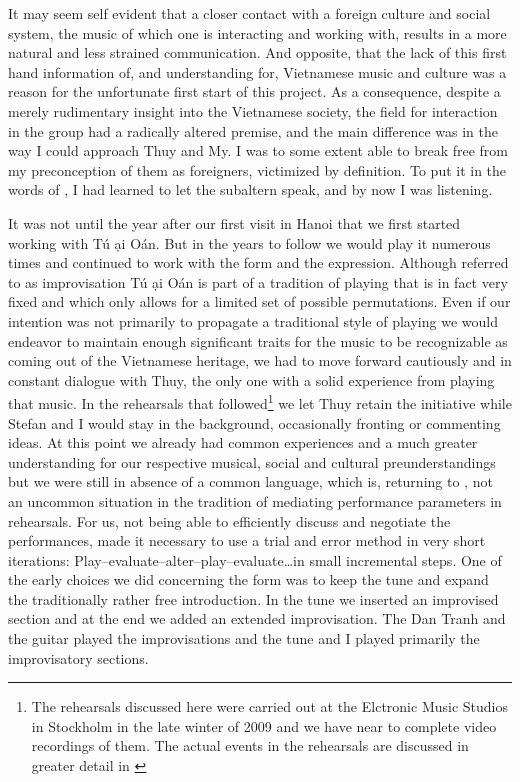 \documentclass[a4paper]{article}
\begin{document}
It may seem self evident that a closer contact with a foreign culture and social system, the music of which one is interacting and working with, results in a more natural and less strained communication. And opposite, that the lack of this first hand information of, and understanding for, Vietnamese music and culture was a reason for the unfortunate first start of this project. As a consequence, despite a merely rudimentary insight into the Vietnamese society, the field for interaction in the group had a radically altered premise, and the main difference was in the way I could approach Thuy and My. I was to some extent able to break free from my preconception of them as foreigners, victimized by definition. To put it in the words of \citep{spivak1988}, I had learned to let the subaltern speak, and by now I was listening. 

It was not until the year after our first visit in Hanoi that we first started working with T\'{u} \DH \d{a}i O\'{a}n. But in the years to follow we would play it numerous times and continued to work with the form and the expression. Although referred to as improvisation T\'{u} \DH \d{a}i O\'{a}n is part of a tradition of playing that is in fact very fixed and which only allows for a limited set of possible permutations. Even if our intention was not primarily to propagate a traditional style of playing we would endeavor to maintain enough significant traits for the music to be recognizable as coming out of the Vietnamese heritage, we had to move forward cautiously and in constant dialogue with Thuy, the only one with a solid experience from playing that music. In the rehearsals that followed\footnote{The rehearsals discussed here were carried out at the Elctronic Music Studios in Stockholm in the late winter of 2009 and we have near to complete video recordings of them. The actual events in the rehearsals are discussed in greater detail in \citet{Ostersjo2013}} we let Thuy retain the initiative while Stefan and I would stay in the background, occasionally fronting or commenting ideas. At this point we already had common experiences and a much greater understanding for our respective musical, social and cultural preunderstandings but we were still in absence of a common language, which is, returning to \citet{emmerson06}, not an uncommon situation in the tradition of mediating performance parameters in rehearsals. For us, not being able to efficiently discuss and negotiate the performances, made it necessary to use a trial and error method in very short iterations: Play--evaluate--alter--play--evaluate\ldots in small incremental steps. One of the early choices we did concerning the form was to keep the tune and expand the traditionally rather free introduction. In the tune we inserted an improvised section and at the end we added an extended improvisation. The Dan Tranh and the guitar played the improvisations and the tune and I played primarily the improvisatory sections.
\end{document}
